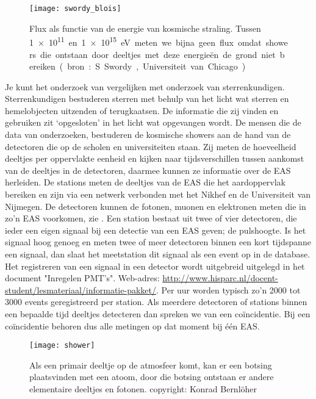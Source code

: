 \begin{figure}
    \centering
    \texttt{[image: swordy\_blois]}
    \caption{Flux als functie van de energie van kosmische straling. Tussen
    \SI{1e11} en \SI{1e15}\electronvolt meten we bijna geen flux omdat
    showers die ontstaan door deeltjes met deze energieën de grond niet bereiken. 
    (bron: S. Swordy, Universiteit van Chicago)}
    \label{fig:swordy_blois}
\end{figure}

Je kunt het onderzoek van \hisparc vergelijken met onderzoek van
sterrenkundigen. Sterrenkundigen bestuderen sterren met behulp van het
licht wat sterren en hemelobjecten uitzenden of terugkaatsen. De
informatie die zij vinden en gebruiken zit ‘opgesloten’ in het licht wat
opgevangen wordt. De mensen die de data van \hisparc onderzoeken,
bestuderen de kosmische showers aan de hand van de detectoren die op de
scholen en universiteiten staan. Zij meten de hoeveelheid deeltjes per
oppervlakte eenheid en kijken naar tijdsverschillen tussen aankomst van
de deeltjes in de detectoren, daarmee kunnen ze informatie over de EAS
herleiden. De \hisparc stations meten de deeltjes van de EAS die
het aardoppervlak bereiken en zijn via een netwerk verbonden met het
Nikhef en de Universiteit van Nijmegen. De \hisparc detectoren kunnen
de fotonen, muonen en elektronen meten die in zo’n EAS voorkomen, zie .
Een station bestaat uit twee of vier detectoren, die ieder
een eigen signaal bij een detectie van een EAS geven; de pulshoogte. Is
het signaal hoog genoeg en meten twee of meer detectoren binnen een kort
tijdspanne een signaal, dan slaat het meetstation dit signaal als een
event op in de database. Het registreren van een signaal in een detector wordt 
uitgebreid uitgelegd in het document "Inregelen PMT's". 
Web-adres: \url{http://www.hisparc.nl/docent-student/lesmateriaal/informatie-pakket/}.
Per uur worden typisch zo’n 2000 tot 3000
events geregistreerd per station. Als meerdere detectoren of stations
binnen een bepaalde tijd deeltjes detecteren dan spreken we van een
coïncidentie. Bij een coïncidentie behoren dus alle metingen op dat
moment bij één EAS.

\begin{figure}
    \centering
    \texttt{[image: shower]}
    \caption{Als een primair deeltje op de atmosfeer komt, kan er een botsing plaatsvinden
    met een atoom, door die botsing ontstaan er andere elementaire deeltjes en fotonen.
    copyright: Konrad Bernlöher}
    \label{fig:shower}
\end{figure}

